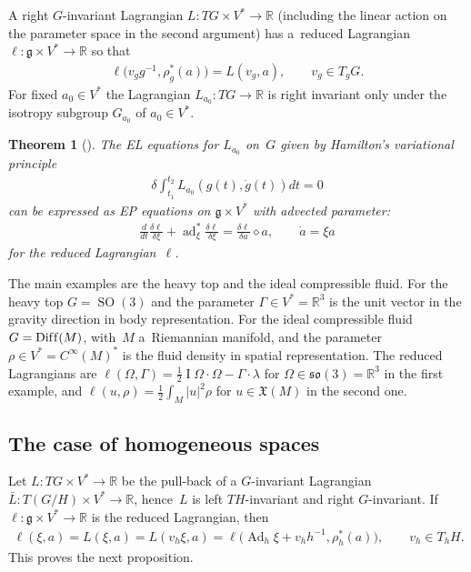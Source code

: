\documentclass[pdftex]{sigma}
\numberwithin{equation}{section}
\newtheorem{Theorem}{Theorem}[section]
\begin{document}
A right $G$-invariant Lagrangian $L:TG\times V^*\rightarrow\mathbb{R}$ (including the linear action on the parameter
space in the second argument) has a~reduced Lagrangian {$\ell:\mathfrak{g}\times V^*\rightarrow\mathbb{R}$} so that
\begin{gather*}
\ell\big(v_gg^{-1},\rho^*_{g}(a)\big)=L(v_g,a),
\qquad
v_g\in T_gG.
\end{gather*}
For f\/ixed $a_0\in V^*$ the Lagrangian $L_{a_0}:TG\rightarrow\mathbb{R}$ is right invariant only under the isotropy
subgroup $G_{a_0}$ of $a_0\in V^*$.

\begin{Theorem}[\cite{CHMR}]
\label{lini}
The EL equations for $L_{a_0}$ on~$G$ given by Hamilton's variational principle
\begin{gather*}
\delta\int_{t_1}^{t_2}L_{a_0}(g(t),\dot{g}(t))dt=0
\end{gather*}
can be expressed as EP equations on $\mathfrak g\times V^*$ with advected parameter:
\begin{gather}
\label{rightep}
{\frac{d}{dt}\frac{\delta\ell}{\delta\xi}+\operatorname{ad}^*_\xi\frac{\delta \ell}{\delta\xi}=\frac{\delta\ell}{\delta
a}\diamond a},
\qquad
\dot{a}=\xi a
\end{gather}
for the reduced Lagrangian~$\ell$.
\end{Theorem}

The main examples are the heavy top and the ideal compressible f\/luid.
For the heavy top $G=\operatorname{SO}(3)$ and the parameter $\Gamma\in V^*=\mathbb R^3$ is the unit vector in the
gravity direction in body representation.
For the ideal compressible f\/luid $G=\operatorname{Dif\/f}(M)$, with~$M$ a~Riemannian manifold, and the parameter $\rho\in
V^*= C^{\infty}(M)^*$ is the f\/luid density in spatial representation.
The reduced Lagrangians are $\ell(\Omega,\Gamma)=\frac12 \operatorname{I}\Omega\cdot\Omega-\Gamma\cdot\lambda$ for
$\Omega\in\mathfrak{so}(3)=\mathbb R^3$ in the f\/irst example, and $\ell(u,\rho)=\frac12\int_M|u|^2\rho$ for
$u\in\mathfrak X(M)$ in the second one.



\subsection{The case of homogeneous spaces}

Let $L:TG\times V^*\to\mathbb R$ be the pull-back of a $G$-invariant Lagrangian $\bar L:T(G/H)\times V^*\to\mathbb R$,
hence~$L$ is left $TH$-invariant and right $G$-invariant.
If $\ell:\mathfrak g\times V^*\to\mathbb R$ is the reduced Lagrangian, then
\begin{gather*}
\ell(\xi,a)=L(\xi,a)=L(v_h\xi,a) =\ell\big({\operatorname{Ad}_h\xi}+v_hh^{-1},\rho^*_{h}(a)\big),
\qquad
v_h\in T_hH.
\end{gather*}
This proves the next proposition.
\end{document}
